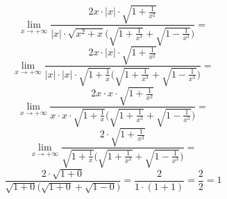 \documentclass{article}
\begin{document}
\begin{equation*}
    \lim_{x \to +\infty} \frac{2x \cdot |x| \cdot \sqrt{1 + \frac{1}{x^{2}}}} {|x| \cdot \sqrt{x^2 + x}\Bigg(\sqrt{1 + \frac{1}{x^3}} + \sqrt{1 - \frac{1}{x^3}}\Bigg)} = 
\end{equation*}
\begin{equation*}
    \lim_{x \to +\infty} \frac{2x \cdot |x| \cdot \sqrt{1 + \frac{1}{x^{2}}}} {|x| \cdot |x| \cdot \sqrt{1 + \frac{1}{x}}\Bigg(\sqrt{1 + \frac{1}{x^3}} + \sqrt{1 - \frac{1}{x^3}}\Bigg)} = 
\end{equation*}
\begin{equation*}
    \lim_{x \to +\infty} \frac{2x \cdot x \cdot \sqrt{1 + \frac{1}{x^{2}}}} {x \cdot x \cdot \sqrt{1 + \frac{1}{x}}\Bigg(\sqrt{1 + \frac{1}{x^3}} + \sqrt{1 - \frac{1}{x^3}}\Bigg)} = 
\end{equation*}
\begin{equation*}
    \lim_{x \to +\infty} \frac{2 \cdot \sqrt{1 + \frac{1}{x^{2}}}} {\sqrt{1 + \frac{1}{x}}\Bigg(\sqrt{1 + \frac{1}{x^3}} + \sqrt{1 - \frac{1}{x^3}}\Bigg)} = 
\end{equation*}
\begin{equation*}
    \frac{2 \cdot \sqrt{1 + 0}} {\sqrt{1 + 0}\Bigg(\sqrt{1 + 0} + \sqrt{1 - 0}\Bigg)} = \frac{2}{1 \cdot (1 + 1)} = \frac{2}{2} = 1
\end{equation*}
\end{document}
